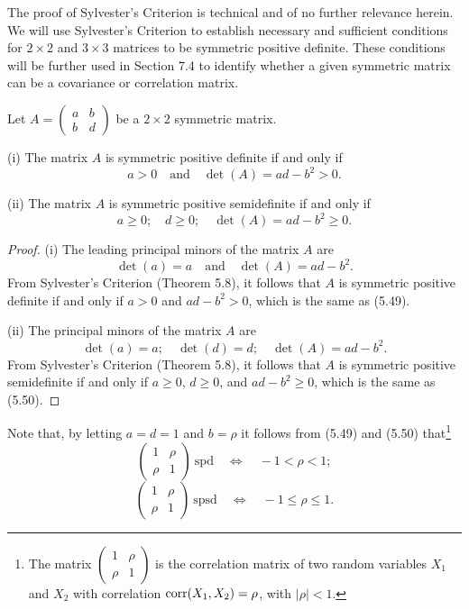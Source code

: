 The proof of Sylvester's Criterion is technical and of no further relevance herein.
We will use Sylvester's Criterion to establish necessary and sufficient conditions for
$2 \times 2$ and $3 \times 3$ matrices to be symmetric positive definite. These
conditions will be further used in Section 7.4 to identify whether a given symmetric
matrix can be a covariance or correlation matrix.

\begin{lemma}
Let $A = \begin{pmatrix} a & b\\ b & d \end{pmatrix}$ be a $2 \times 2$ symmetric
matrix.

(i) The matrix $A$ is symmetric positive definite if and only if
\begin{equation}
a > 0 \quad \text{and} \quad \det(A) = ad-b^2 > 0.
\end{equation}

(ii) The matrix $A$ is symmetric positive semidefinite if and only if
\begin{equation}
a \geq 0; \quad d \geq 0; \quad \det(A) = ad-b^2 \geq 0.
\end{equation}
\end{lemma}

\begin{proof}
(i) The leading principal minors of the matrix $A$ are
\[
\det(a) = a \quad \text{and} \quad \det(A) = ad-b^2.
\]
From Sylvester's Criterion (Theorem 5.8), it follows that $A$ is symmetric positive
definite if and only if $a > 0$ and $ad-b^2 > 0$, which is the same as (5.49).

(ii) The principal minors of the matrix $A$ are
\[
\det(a) = a; \quad \det(d) = d; \quad \det(A) = ad-b^2.
\]
From Sylvester's Criterion (Theorem 5.8), it follows that $A$ is symmetric positive
semidefinite if and only if $a \geq 0$, $d \geq 0$, and $ad-b^2 \geq 0$, which is the
same as (5.50).
\end{proof}

Note that, by letting $a = d = 1$ and $b = \rho$ it follows from (5.49) and (5.50)
that\footnote{The matrix $\begin{pmatrix} 1 & \rho\\ \rho & 1 \end{pmatrix}$ is the
correlation matrix of two random variables $X_1$ and $X_2$ with correlation
$\operatorname{corr}(X_1,X_2) = \rho$, with $|\rho| < 1$.}
\begin{equation}
\begin{pmatrix} 1 & \rho\\ \rho & 1 \end{pmatrix} \ \text{spd} \quad \Longleftrightarrow \quad -1 < \rho < 1;
\end{equation}
\begin{equation}
\begin{pmatrix} 1 & \rho\\ \rho & 1 \end{pmatrix} \ \text{spsd} \quad \Longleftrightarrow \quad -1 \leq \rho \leq 1.
\end{equation}

